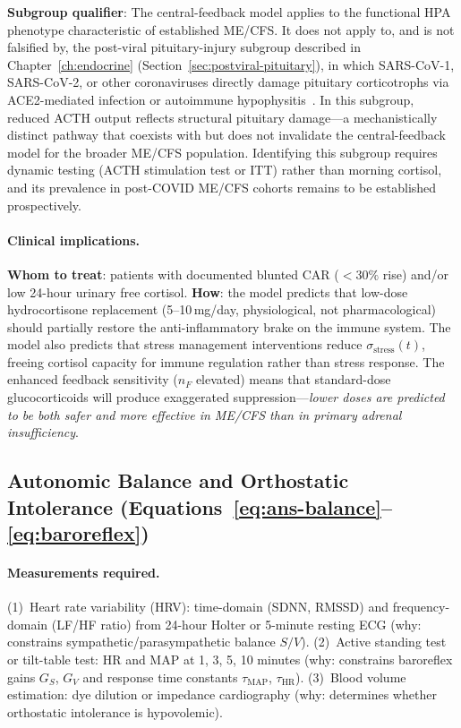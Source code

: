 \textbf{Subgroup qualifier}: The central-feedback model applies to the functional HPA phenotype characteristic of established ME/CFS. It does not apply to, and is not falsified by, the post-viral pituitary-injury subgroup described in Chapter~\ref{ch:endocrine} (Section~\ref{sec:postviral-pituitary}), in which SARS-CoV-1, SARS-CoV-2, or other coronaviruses directly damage pituitary corticotrophs via ACE2-mediated infection or autoimmune hypophysitis~\cite{Leow2005sars,Carosi2024hypopituitarism}. In this subgroup, reduced ACTH output reflects structural pituitary damage---a mechanistically distinct pathway that coexists with but does not invalidate the central-feedback model for the broader ME/CFS population. Identifying this subgroup requires dynamic testing (ACTH stimulation test or ITT) rather than morning cortisol, and its prevalence in post-COVID ME/CFS cohorts remains to be established prospectively.

\paragraph{Clinical implications.}
\textbf{Whom to treat}: patients with documented blunted CAR ($< 30\%$ rise) and/or low 24-hour urinary free cortisol. \textbf{How}: the model predicts that low-dose hydrocortisone replacement (5--10\,mg/day, physiological, not pharmacological) should partially restore the anti-inflammatory brake on the immune system. The model also predicts that stress management interventions reduce $\sigma_{\text{stress}}(t)$, freeing cortisol capacity for immune regulation rather than stress response. The enhanced feedback sensitivity ($n_F$ elevated) means that standard-dose glucocorticoids will produce exaggerated suppression---\emph{lower doses are predicted to be both safer and more effective in ME/CFS than in primary adrenal insufficiency}.

\subsection{Autonomic Balance and Orthostatic Intolerance (Equations~\ref{eq:ans-balance}--\ref{eq:baroreflex})}

\paragraph{Measurements required.}
(1)~Heart rate variability (HRV): time-domain (SDNN, RMSSD) and frequency-domain (LF/HF ratio) from 24-hour Holter or 5-minute resting ECG (why: constrains sympathetic/parasympathetic balance $S/V$).
(2)~Active standing test or tilt-table test: HR and MAP at 1, 3, 5, 10 minutes (why: constrains baroreflex gains $G_S$, $G_V$ and response time constants $\tau_{\text{MAP}}$, $\tau_{\text{HR}}$).
(3)~Blood volume estimation: dye dilution or impedance cardiography (why: determines whether orthostatic intolerance is hypovolemic).

